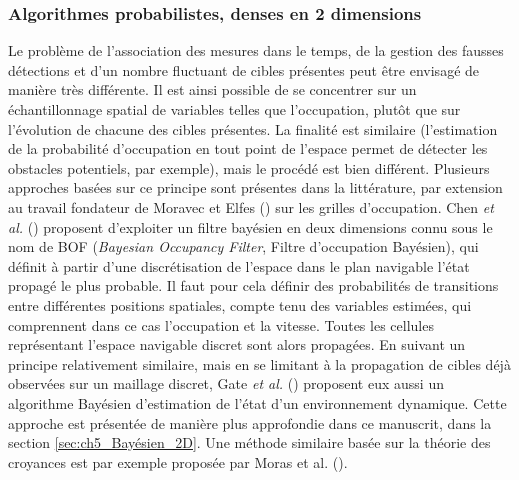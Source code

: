 \subsubsection{Algorithmes probabilistes, denses en 2 dimensions}
Le problème de l'association des mesures dans le temps, de la gestion des fausses détections et d'un nombre fluctuant de cibles présentes peut être envisagé de manière très différente. Il est ainsi possible de se concentrer sur un échantillonnage spatial de variables telles que l'occupation, plutôt que sur l'évolution de chacune des cibles présentes. La finalité est similaire (l'estimation de la probabilité d'occupation en tout point de l'espace permet de détecter les obstacles potentiels, par exemple), mais le procédé est bien différent. Plusieurs approches basées sur ce principe sont présentes dans la littérature, par extension au travail fondateur de Moravec et Elfes (\cite{Moravec1985, Moravec1988}) sur les grilles d'occupation. Chen \textit{et al.} (\cite{Chen2006}) proposent d'exploiter un filtre bayésien en deux dimensions connu sous le nom de BOF (\emph{Bayesian Occupancy Filter}, Filtre d'occupation Bayésien), qui définit à partir d'une discrétisation de l'espace dans le plan navigable l'état propagé le plus probable. Il faut pour cela définir des probabilités de transitions entre différentes positions spatiales, compte tenu des variables estimées, qui comprennent dans ce cas l'occupation et la vitesse. Toutes les cellules représentant l'espace navigable discret sont alors propagées. En suivant un principe relativement similaire, mais en se limitant à la propagation de cibles déjà observées sur un maillage discret, Gate \textit{et al.} (\cite{Gate2009}) proposent eux aussi un algorithme Bayésien d'estimation de l'état d'un environnement dynamique. Cette approche est présentée de manière plus approfondie dans ce manuscrit, dans la section \ref{sec:ch5_Bayésien_2D}. Une méthode similaire basée sur la théorie des croyances est par exemple proposée par Moras et al. (\cite{Moras2011a}).

